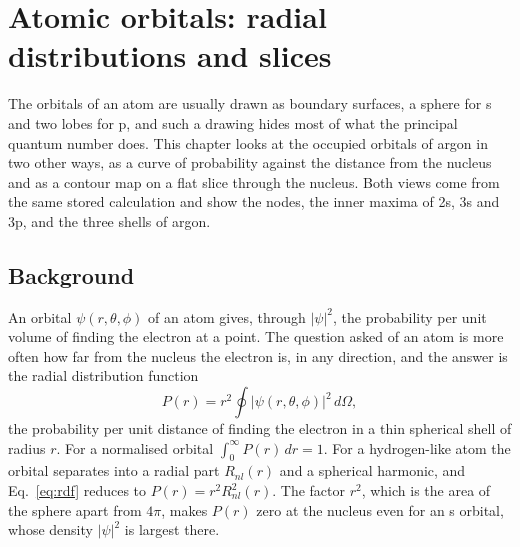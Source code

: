 \chapter{Atomic orbitals: radial distributions and slices}
\label{ch:atomic-orbitals}


The orbitals of an atom are usually drawn as boundary surfaces, a sphere for s and two lobes for p, and such a drawing hides most of what the principal quantum number does. This chapter looks at the occupied orbitals of argon in two other ways, as a curve of probability against the distance from the nucleus and as a contour map on a flat slice through the nucleus. Both views come from the same stored calculation and show the nodes, the inner maxima of 2s, 3s and 3p, and the three shells of argon.

\section{Background}
An orbital $\psi(r,\theta,\phi)$ of an atom gives, through $|\psi|^2$, the probability per unit volume of finding the electron at a point. The question asked of an atom is more often how far from the nucleus the electron is, in any direction, and the answer is the radial distribution function
\begin{equation}
	P(r) = r^2 \oint |\psi(r,\theta,\phi)|^2 \, d\Omega ,
	\label{eq:rdf}
\end{equation}
the probability per unit distance of finding the electron in a thin spherical shell of radius $r$. For a normalised orbital $\int_0^\infty P(r)\,dr = 1$. For a hydrogen-like atom the orbital separates into a radial part $R_{nl}(r)$ and a spherical harmonic, and Eq.~\eqref{eq:rdf} reduces to $P(r) = r^2 R_{nl}^2(r)$. The factor $r^2$, which is the area of the sphere apart from $4\pi$, makes $P(r)$ zero at the nucleus even for an s orbital, whose density $|\psi|^2$ is largest there.

